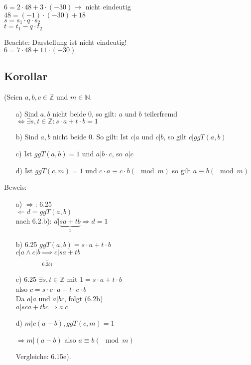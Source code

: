 \documentclass[a4paper, 12pt, twoside] {article}
\begin{document}
$6 = 2 \cdot 48 + 3 \cdot (-30) \rightarrow$ nicht eindeutig \\
$48 = (-1) \cdot (-30) + 18$ \\
$s = s_1 \cdot q \cdot s_2$ \\
$t = t_1 - q \cdot t_2$

Beachte: Darstellung ist nicht eindeutig! \\
$6 = 7 \cdot 48 + 11 \cdot (-30)$

\subsection{Korollar} %
(Seien $a, b, c \in \mathbb{Z}$ und $m \in \mathbb{N}.$

\begin{itemize}

\item[a)] Sind $a, b$ nicht beide $0$, so gilt:
$a$ und $b$ teilerfremd $\Leftrightarrow \exists s, t \in \mathbb{Z}: s \cdot a + t \cdot b = 1$

\item[b)] Sind $a, b$ nicht beide $0$. So gilt:
Ist $c|a$ und $c|b$, so gilt $c | ggT(a, b)$

\item[c)] Ist $ggT(a, b) = 1$ und $a|b \cdot c$, so $a | c$

\item[d)] Ist $ggT(c, m) = 1$ und $c \cdot a \equiv c \cdot b (\mod m)$
so gilt $a \equiv b (\mod m)$

\end{itemize}

Beweis:

\begin{itemize}

\item[a)] $\Rightarrow$: 6.25 \\
$\Leftarrow d = ggT(a, b)$ \\
nach 6.2.b): $d | \underbrace{sa + tb}_{1} \Rightarrow d = 1$

\item[b)] 6.25 $ggT(a, b) = s \cdot a + t \cdot b$ \\
$c |a \wedge c | b \underbrace{\Rightarrow}_{6.2b)} c | sa + tb$

\item[c)] 6.25 $\exists s, t \in \mathbb{Z}$ mit $1 = s \cdot a + t \cdot b$ \\
also $c = s \cdot c \cdot a + t \cdot c \cdot b$ \\
Da $a | a$ und $a | bc$, folgt (6.2b) \\
$a | sca + tbc \Rightarrow a | c$

\item[d)] $m | c (a-b), ggT(c, m) = 1$

$\Rightarrow m | (a -b)$ also $a \equiv b (\mod m)$

Vergleiche: 6.15e).

\end{itemize}
\end{document}
